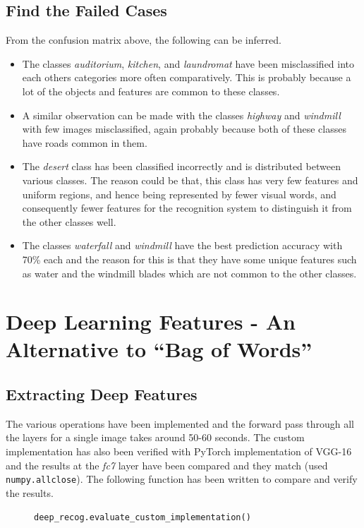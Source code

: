 \documentclass[a4paper]{article}
\begin{document}
\subsection{Find the Failed Cases}
From the confusion matrix above, the following can be inferred.
\begin{itemize}
    \item The classes \textit{auditorium}, \textit{kitchen}, and \textit{laundromat} have been misclassified into each others categories more often comparatively. This is probably because a lot of the objects and features are common to these classes.
    \item A similar observation can be made with the classes \textit{highway} and \textit{windmill} with few images misclassified, again probably because both of these classes have roads common in them.
    \item The \textit{desert} class has been classified incorrectly and is distributed between various classes. The reason could be that, this class has very few features and uniform regions, and hence being represented by fewer visual words, and consequently fewer features for the recognition system to distinguish it from the other classes well. 
    \item The classes \textit{waterfall} and \textit{windmill} have the best prediction accuracy with 70\% each and the reason for this is that they have some unique features such as water and the windmill blades which are not common to the other classes.
\end{itemize}

\section{Deep Learning Features - An Alternative to “Bag of Words”}
\subsection{Extracting Deep Features}
The various operations have been implemented and the forward pass through all the layers for a single image takes around 50-60 seconds. The custom implementation has also been verified with PyTorch implementation of VGG-16 and the results at the \textit{fc7} layer have been compared and they match (used \texttt{numpy.allclose}). The following function has been written to compare and verify the results.

\begin{figure}[!ht]
\centering
\begin{BVerbatim}
deep_recog.evaluate_custom_implementation()
\end{BVerbatim}
\end{figure}
\end{document}
